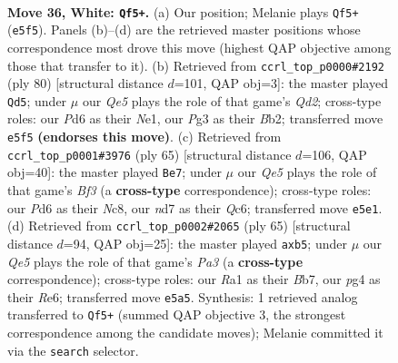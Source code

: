 \documentclass[11pt]{article}
\begin{document}
\clearpage

\begin{figure}[p]\centering
\begin{subfigure}{0.46\textwidth}\centering
\resizebox{\linewidth}{!}{%
\newchessgame
\chessboard[
  setfen={3q4/1b1n1p1k/1p1P1n2/4Q2p/p1P3pP/6P1/PB3P2/R5K1 w - - 3 36},
  showmover=false,
  pgfstyle=straightmove, color=movearrow, markmove={e5-f5}
]}
\caption{}
\end{subfigure}\hfill
\begin{subfigure}{0.46\textwidth}\centering
\resizebox{\linewidth}{!}{%
\newchessgame
\chessboard[
  setfen={6k1/4qpp1/Ppn1n3/4p2p/1p2P3/6Pb/1B1QBP1P/4N1K1 w - - 3 41},
  showmover=false,
  pgfstyle=straightmove, color=movearrow, markmove={d2-d5}
]}
\caption{}
\end{subfigure}
\\[4pt]
\begin{subfigure}{0.46\textwidth}\centering
\resizebox{\linewidth}{!}{%
\newchessgame
\chessboard[
  setfen={2n3k1/5p2/p1q1pbp1/2p3N1/2P1N2P/4P3/P4P2/1Q4K1 b - - 1 33},
  showmover=false,
  pgfstyle=straightmove, color=movearrow, markmove={f6-e7}
]}
\caption{}
\end{subfigure}\hfill
\begin{subfigure}{0.46\textwidth}\centering
\resizebox{\linewidth}{!}{%
\newchessgame
\chessboard[
  setfen={8/1b2kp2/p3r1p1/qN1p2P1/3P1Q2/P2B1N2/1K3P2/8 b - - 4 33},
  showmover=false,
  pgfstyle=straightmove, color=movearrow, markmove={a6-b5}
]}
\caption{}
\end{subfigure}
\caption{\textbf{Move 36, White: \texttt{Qf5+}.} (a) Our position; Melanie plays \texttt{Qf5+} (\texttt{e5f5}). Panels (b)--(d) are the retrieved master positions whose correspondence most drove this move (highest QAP objective among those that transfer to it). (b) Retrieved from \texttt{ccrl\_top\_p0000\#2192} (ply 80) [structural distance $d$=101, QAP obj=3]: the master played \texttt{Qd5}; under $\mu$ our \emph{Qe5} plays the role of that game's \emph{Qd2}; cross-type roles: our \emph{P}d6 as their \emph{N}e1, our \emph{P}g3 as their \emph{B}b2; transferred move \texttt{e5f5} \textbf{(endorses this move)}. (c) Retrieved from \texttt{ccrl\_top\_p0001\#3976} (ply 65) [structural distance $d$=106, QAP obj=40]: the master played \texttt{Be7}; under $\mu$ our \emph{Qe5} plays the role of that game's \emph{Bf3} (a \textbf{cross-type} correspondence); cross-type roles: our \emph{P}d6 as their \emph{N}c8, our \emph{n}d7 as their \emph{Q}c6; transferred move \texttt{e5e1}. (d) Retrieved from \texttt{ccrl\_top\_p0002\#2065} (ply 65) [structural distance $d$=94, QAP obj=25]: the master played \texttt{axb5}; under $\mu$ our \emph{Qe5} plays the role of that game's \emph{Pa3} (a \textbf{cross-type} correspondence); cross-type roles: our \emph{R}a1 as their \emph{B}b7, our \emph{p}g4 as their \emph{R}e6; transferred move \texttt{e5a5}. Synthesis: 1 retrieved analog transferred to \texttt{Qf5+} (summed QAP objective 3, the strongest correspondence among the candidate moves); Melanie committed it via the \texttt{search} selector.}
\label{fig:thought-m70}
\end{figure}
\end{document}

